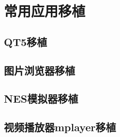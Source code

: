 \chapter{常用应用移植}

\section{QT5移植}


\section{图片浏览器移植}



\section{NES模拟器移植}


\section{视频播放器mplayer移植}

